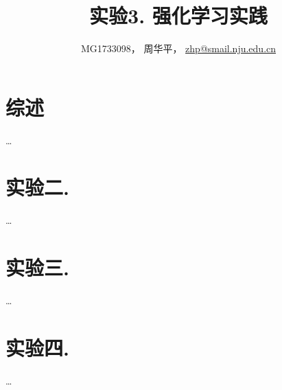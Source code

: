 \documentclass[a4paper,UTF8]{article}
\theoremstyle{definition}
\begin{document}
\title{实验3. 强化学习实践}
\author{MG1733098， 周华平， \url{zhp@smail.nju.edu.cn}}
\maketitle

\section*{综述}
	\dots

\section*{实验二. }

	\dots
	
\section*{实验三. }
	\dots
	
\section*{实验四. }
	\dots
\end{document}
